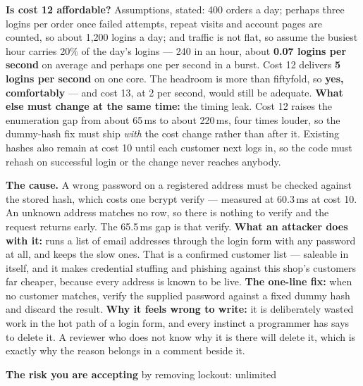 \begin{ans}
  \item \textbf{Is cost 12 affordable?} Assumptions, stated: 400 orders a day;
        perhaps three logins per order once failed attempts, repeat visits and
        account pages are counted, so about 1{,}200 logins a day; and traffic
        is not flat, so assume the busiest hour carries 20\% of the day's
        logins --- 240 in an hour, about \textbf{0.07 logins per second} on
        average and perhaps one per second in a burst. Cost 12 delivers
        \textbf{5 logins per second} on one core. The headroom is more than
        fiftyfold, so \textbf{yes, comfortably} --- and cost 13, at 2 per
        second, would still be adequate. \textbf{What else must change at the
        same time:} the timing leak. Cost 12 raises the enumeration gap from
        about 65\,ms to about 220\,ms, four times louder, so the dummy-hash fix
        must ship \emph{with} the cost change rather than after it. Existing
        hashes also remain at cost 10 until each customer next logs in, so the
        code must rehash on successful login or the change never reaches
        anybody.
  \item \textbf{The cause.} A wrong password on a registered address must be
        checked against the stored hash, which costs one bcrypt verify ---
        measured at 60.3\,ms at cost 10. An unknown address matches no row, so
        there is nothing to verify and the request returns early. The 65.5\,ms
        gap is that verify. \textbf{What an attacker does with it:} runs a list
        of email addresses through the login form with any password at all, and
        keeps the slow ones. That is a confirmed customer list --- saleable in
        itself, and it makes credential stuffing and phishing against this
        shop's customers far cheaper, because every address is known to be
        live. \textbf{The one-line fix:} when no customer matches, verify the
        supplied password against a fixed dummy hash and discard the result.
        \textbf{Why it feels wrong to write:} it is deliberately wasted work in
        the hot path of a login form, and every instinct a programmer has says
        to delete it. A reviewer who does not know why it is there will delete
        it, which is exactly why the reason belongs in a comment beside it.
  \item \textbf{The risk you are accepting} by removing lockout: unlimited

\end{ans}
